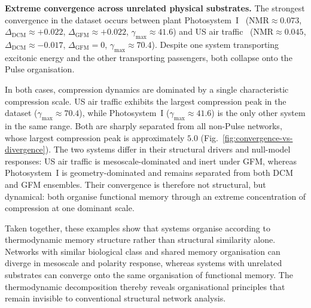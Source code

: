 \documentclass[aps,superscriptaddress,11pt]{revtex4-2}
\newcommand{\NMR}{\mathrm{NMR}}
\theoremstyle{definition}
\theoremstyle{plain}
\begin{document}
\medskip 
\noindent\textbf{Extreme convergence across unrelated physical substrates.}
The strongest convergence in the dataset occurs between plant
Photosystem~I~\cite{Mohseni2008}
($\NMR \approx 0.073$, $\Delta_{\mathrm{DCM}} \approx +0.022$,
$\Delta_{\mathrm{GFM}} \approx +0.022$,
$\gamma_{\max} \approx 41.6$)
and US air traffic~\cite{Barrat2004}
($\NMR \approx 0.045$, $\Delta_{\mathrm{DCM}} \approx -0.017$,
$\Delta_{\mathrm{GFM}} = 0$, $\gamma_{\max} \approx 70.4$). Despite one
system transporting excitonic energy and the other transporting passengers,
both collapse onto the Pulse organisation.

In both cases, compression dynamics are dominated by a single characteristic
compression scale. US air traffic exhibits the largest compression peak in
the dataset ($\gamma_{\max}\approx 70.4$), while Photosystem~I
($\gamma_{\max}\approx 41.6$) is the only other system in the same range.
Both are sharply separated from all non-Pulse networks, whose largest
compression peak is approximately $5.0$
(Fig.~\ref{fig:convergence-vs-divergence}). The two systems differ in
their structural drivers and null-model responses: US air traffic is
mesoscale-dominated and inert under GFM, whereas Photosystem~I is
geometry-dominated and remains separated from both DCM and GFM ensembles.
Their convergence is therefore not structural, but dynamical: both organise
functional memory through an extreme concentration of compression at one
dominant scale.

Taken together, these examples show that systems organise according to
thermodynamic memory structure rather than structural similarity alone.
Networks with similar biological class and shared memory organisation can
diverge in mesoscale and polarity response, whereas systems with unrelated
substrates can converge onto the same organisation of functional memory.
The thermodynamic decomposition thereby reveals organisational principles
that remain invisible to conventional structural network analysis.
\end{document}
